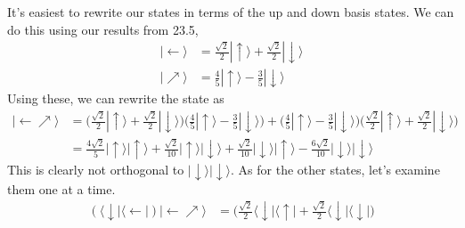 \documentclass[../road-to-reality.tex]{subfiles}
\begin{document}
\begin{questions}
		\begin{solution}
			It's easiest to rewrite our states in terms of the up and down basis states. We can do this using our results from 23.5,
			\begin{align*}
				|\!\leftarrow\rangle &= \frac{\sqrt{2}}{2}|\!\uparrow\rangle + \frac{\sqrt{2}}{2}|\!\downarrow\rangle \\
				|\!\nearrow\rangle &= \frac{4}{5}|\!\uparrow\rangle - \frac{3}{5}|\!\downarrow\rangle
			\end{align*}
			Using these, we can rewrite the state as
			\begin{align*}
				|\!\leftarrow\nearrow\rangle &= \Big(\frac{\sqrt{2}}{2}|\!\uparrow\rangle + \frac{\sqrt{2}}{2}|\!\downarrow\rangle\Big)\Big(\frac{4}{5}|\!\uparrow\rangle - \frac{3}{5}|\!\downarrow\rangle\Big) + \Big(\frac{4}{5}|\!\uparrow\rangle - \frac{3}{5}|\!\downarrow\rangle\Big)\Big(\frac{\sqrt{2}}{2}|\!\uparrow\rangle + \frac{\sqrt{2}}{2}|\!\downarrow\rangle\Big) \\
				&= \frac{4\sqrt{2}}{5}|\!\uparrow\rangle|\!\uparrow\rangle + \frac{\sqrt{2}}{10}|\!\uparrow\rangle|\!\downarrow\rangle + \frac{\sqrt{2}}{10}|\!\downarrow\rangle|\!\uparrow\rangle - \frac{6\sqrt{2}}{10}|\!\downarrow\rangle|\!\downarrow\rangle
			\end{align*}
			This is clearly not orthogonal to $|\!\downarrow\rangle|\!\downarrow\rangle$. As for the other states, let's examine them one at a time.
			\begin{align*}
				(\langle\downarrow|\langle\leftarrow\!|)|\!\leftarrow\nearrow\rangle &= \Big(\frac{\sqrt{2}}{2}\langle\downarrow\!|\langle\uparrow\!| + \frac{\sqrt{2}}{2}\langle\downarrow|\langle\downarrow\!|\Big)
			\end{align*}
		\end{solution}
	\end{questions}
\end{document}
